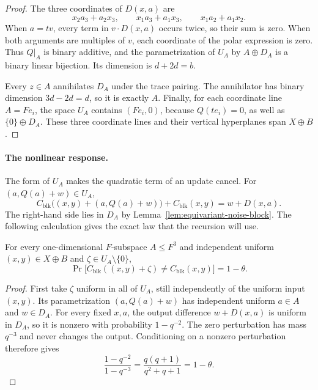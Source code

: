 \begin{proof}
The three coordinates of $D(x,a)$ are
\[
 x_2a_3+a_2x_3,\qquad
 x_1a_3+a_1x_3,\qquad
 x_1a_2+a_1x_2.
\]
When $a=tv$, every term in $v\cdot D(x,a)$ occurs twice, so their sum is
zero.  When both arguments are multiples of $v$, each coordinate of the
polar expression is zero.  Thus $Q|_A$ is binary additive, and the
parametrization of $U_A$ by $A\oplus D_A$ is a binary linear bijection.
Its dimension is $d+2d=b$.

Every $z\in A$ annihilates $D_A$ under the trace pairing.  The annihilator
has binary dimension $3d-2d=d$, so it is exactly $A$.
Finally, for each coordinate line $A=Fe_i$, the space $U_A$ contains
$(Fe_i,0)$, because $Q(te_i)=0$, as well as $\{0\}\oplus D_A$.
These three coordinate lines and their vertical hyperplanes span
$X\oplus B$.
\end{proof}

\paragraph{The nonlinear response.}
The form of $U_A$ makes the quadratic term of an update cancel.  For
$(a,Q(a)+w)\in U_A$,
\[
 C_{\mathrm{blk}}\bigl((x,y)+(a,Q(a)+w)\bigr)
       +C_{\mathrm{blk}}(x,y)
 =w+D(x,a).
\]
The right-hand side lies in $D_A$ by Lemma~\ref{lem:equivariant-noise-block}.
The following calculation gives the exact law that the recursion will use.

\begin{lemma}\label{lem:equivariant-noise-block-noise}
For every one-dimensional $F$-subspace $A\le F^3$ and independent
uniform $(x,y)\in X\oplus B$ and $\zeta\in U_A\setminus\{0\}$,
\[
 \Pr\bigl[C_{\mathrm{blk}}((x,y)+\zeta)
             \ne C_{\mathrm{blk}}(x,y)\bigr]=1-\theta.
\]
\end{lemma}

\begin{proof}
First take $\zeta$ uniform in all of $U_A$, still independently of the
uniform input $(x,y)$.  Its parametrization
$(a,Q(a)+w)$ has independent uniform $a\in A$ and $w\in D_A$.
For every fixed $x,a$, the output difference $w+D(x,a)$ is uniform in
$D_A$, so it is nonzero with probability $1-q^{-2}$.  The zero
perturbation has mass $q^{-3}$ and never changes the output.  Conditioning
on a nonzero perturbation therefore gives
\[
 \frac{1-q^{-2}}{1-q^{-3}}
 =\frac{q(q+1)}{q^2+q+1}=1-\theta.
\]
\end{proof}

